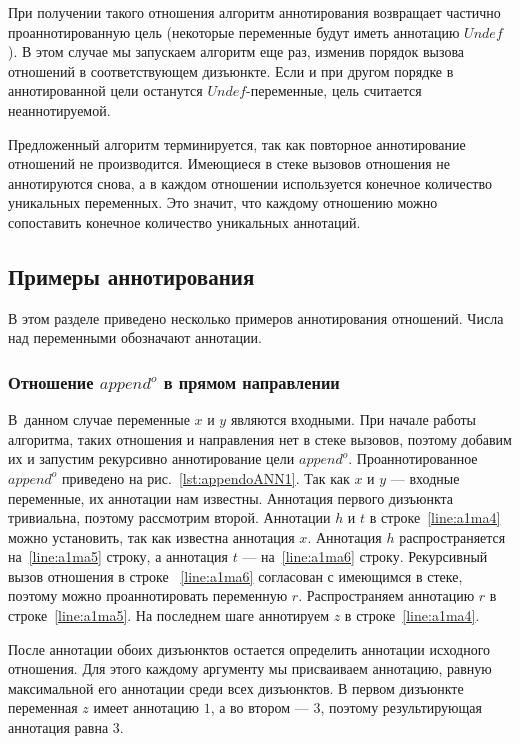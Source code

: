 \documentclass[conference,a4paper,american,russian]{IEEEtran}
\begin{document}
При получении такого отношения алгоритм аннотирования возвращает частично проаннотированную цель (некоторые переменные будут иметь аннотацию  $Undef$).
В этом случае мы запускаем алгоритм еще раз, изменив порядок вызова отношений в соответствующем дизъюнкте.
Если и при другом порядке в аннотированной цели останутся $Undef$-переменные, цель считается неаннотируемой.

Предложенный алгоритм терминируется, так как повторное аннотирование отношений не производится.
Имеющиеся в стеке вызовов отношения не аннотируются снова, а в каждом отношении используется конечное количество уникальных переменных.
Это значит, что каждому отношению можно сопоставить конечное количество уникальных аннотаций.

\subsection{Примеры аннотирования}

В этом разделе приведено несколько примеров аннотирования отношений.
Числа над переменными обозначают аннотации.

\subsubsection{Отношение $append^o$ в прямом направлении}

В~данном случае  переменные $x$ и $y$ являются входными.
При начале работы алгоритма, таких отношения и направления нет в стеке вызовов, поэтому добавим их и запустим рекурсивно аннотирование цели $append^o$.
Проаннотированное $append^o$ приведено на рис.~\ref{lst:appendoANN1}.
Так как $x$ и $y$ --- входные переменные, их аннотации нам известны.
Аннотация первого дизъюнкта тривиальна, поэтому рассмотрим второй.
Аннотации $h$ и $t$ в строке~\ref{line:a1ma4} можно установить, так как известна аннотация $x$.
Аннотация $h$ распространяется на~\ref{line:a1ma5} строку, а аннотация $t$ --- на~\ref{line:a1ma6} строку.
Рекурсивный вызов отношения в строке ~\ref{line:a1ma6} согласован с имеющимся в стеке, поэтому можно проаннотировать переменную $r$.
Распространяем аннотацию $r$ в строке~\ref{line:a1ma5}.
На последнем шаге аннотируем $z$ в строке~\ref{line:a1ma4}.

После аннотации обоих дизъюнктов остается определить аннотации исходного отношения.
Для этого каждому аргументу мы присваиваем аннотацию, равную максимальной его аннотации среди всех дизъюнктов.
В первом дизъюнкте переменная $z$ имеет аннотацию $1$, а во втором --- $3$, поэтому результирующая аннотация равна $3$.
\end{document}
